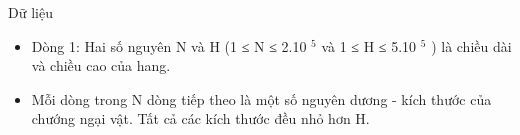 Dữ liệu
\begin{itemize}
	\item Dòng 1: Hai số nguyên N và H (1 ≤ N ≤ 2.10 $^ 5 $ và 1 ≤ H ≤ 5.10 $^ 5 $ ) là chiều dài và chiều cao của hang.
	\item Mỗi dòng trong N dòng tiếp theo là một số nguyên dương - kích thước của chướng ngại vật. Tất cả các kích thước đều nhỏ hơn H.
\end{itemize}